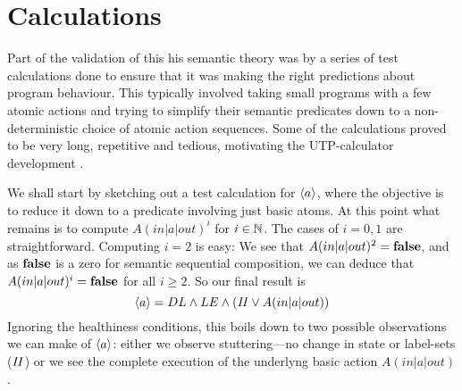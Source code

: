 \section{Calculations}\label{sec:calc}

Part of the validation of this his semantic theory was by a series of test calculations
done to ensure that it was making the right predictions about program behaviour.
This typically involved taking small programs with a few atomic actions
and trying to simplify their semantic predicates
down to a non-deterministic choice of atomic action sequences.
Some of the calculations proved to be very long,
repetitive and tedious,
motivating the UTP-calculator development \cite{DBLP:conf/utp/Butterfield16}.

We shall start by sketching out a test calculation for $\langle a\rangle$,
where the objective is to reduce it down to a predicate involving
just basic atoms.
At this point what remains is to compute $A(in|a|out)^i$ for $i \in \mathbb{N}$.
The cases of $i=0,1$ are straightforward.
Computing $i=2$ is easy:
We see that $A(in|a|out)^2 = \mathbf{false}$, and as $\mathbf{false}$ is a zero for
semantic sequential composition,
we can deduce that $A(in|a|out)^i = \mathbf{false}$ for all $i \geq 2$.
So our final result is
\begin{equation}
  \langle a\rangle = DL \land LE \land(\mathit{II} \lor A(in|a|out))
\end{equation}
Ignoring the healthiness conditions,
this boils down to two possible observations we can make of $\langle a\rangle$:
either we observe stuttering---no change in state or label-sets ($\mathit{II}$)
or we see the complete execution of the underlyng basic action $A(in|a|out)$.

